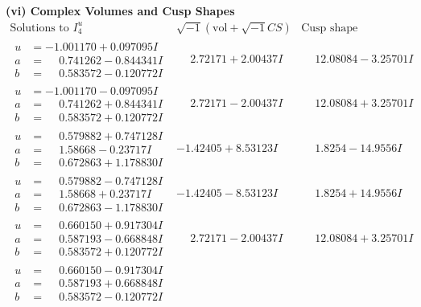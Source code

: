 \documentclass[1p]{elsarticle_modified}
\theoremstyle{definition}
\newcommand{\I}{\sqrt{-1}}
\begin{document}
\newpage\flushleft \textbf{(vi) Complex Volumes and Cusp Shapes}
$$\begin{array}{c|c|c}  
\text{Solutions to }I^u_{4}& \I (\text{vol} + \sqrt{-1}CS) & \text{Cusp shape}\\
 \hline 
\begin{aligned}
u &= -1.001170 + 0.097095 I \\
a &= \phantom{-}0.741262 - 0.844341 I \\
b &= \phantom{-}0.583572 - 0.120772 I\end{aligned}
 & \phantom{-}2.72171 + 2.00437 I & \phantom{-}12.08084 - 3.25701 I \\ \hline\begin{aligned}
u &= -1.001170 - 0.097095 I \\
a &= \phantom{-}0.741262 + 0.844341 I \\
b &= \phantom{-}0.583572 + 0.120772 I\end{aligned}
 & \phantom{-}2.72171 - 2.00437 I & \phantom{-}12.08084 + 3.25701 I \\ \hline\begin{aligned}
u &= \phantom{-}0.579882 + 0.747128 I \\
a &= \phantom{-}1.58668 - 0.23717 I \\
b &= \phantom{-}0.672863 + 1.178830 I\end{aligned}
 & -1.42405 + 8.53123 I & \phantom{-}1.8254 - 14.9556 I \\ \hline\begin{aligned}
u &= \phantom{-}0.579882 - 0.747128 I \\
a &= \phantom{-}1.58668 + 0.23717 I \\
b &= \phantom{-}0.672863 - 1.178830 I\end{aligned}
 & -1.42405 - 8.53123 I & \phantom{-}1.8254 + 14.9556 I \\ \hline\begin{aligned}
u &= \phantom{-}0.660150 + 0.917304 I \\
a &= \phantom{-}0.587193 - 0.668848 I \\
b &= \phantom{-}0.583572 + 0.120772 I\end{aligned}
 & \phantom{-}2.72171 - 2.00437 I & \phantom{-}12.08084 + 3.25701 I \\ \hline\begin{aligned}
u &= \phantom{-}0.660150 - 0.917304 I \\
a &= \phantom{-}0.587193 + 0.668848 I \\
b &= \phantom{-}0.583572 - 0.120772 I\end{aligned}

\end{array}$$
\end{document}
